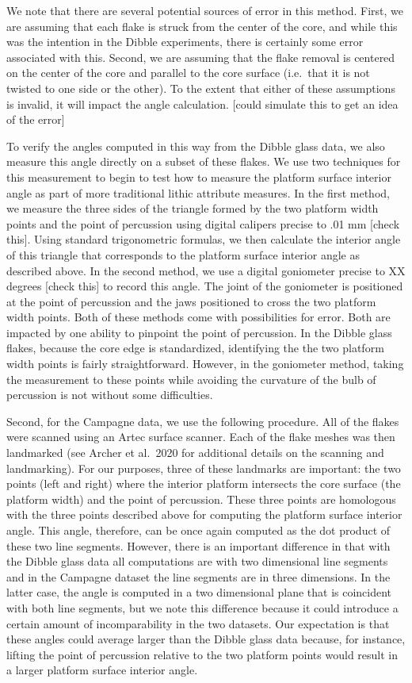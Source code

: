 \documentclass[10pt,letterpaper]{article}
\begin{document}
We note that there are several potential sources of error in this
method. First, we are assuming that each flake is struck from the center
of the core, and while this was the intention in the Dibble experiments,
there is certainly some error associated with this. Second, we are
assuming that the flake removal is centered on the center of the core
and parallel to the core surface (i.e.~that it is not twisted to one
side or the other). To the extent that either of these assumptions is
invalid, it will impact the angle calculation. {[}could simulate this to
get an idea of the error{]}

To verify the angles computed in this way from the Dibble glass data, we
also measure this angle directly on a subset of these flakes. We use two
techniques for this measurement to begin to test how to measure the
platform surface interior angle as part of more traditional lithic
attribute measures. In the first method, we measure the three sides of
the triangle formed by the two platform width points and the point of
percussion using digital calipers precise to .01 mm {[}check this{]}.
Using standard trigonometric formulas, we then calculate the interior
angle of this triangle that corresponds to the platform surface interior
angle as described above. In the second method, we use a digital
goniometer precise to XX degrees {[}check this{]} to record this angle.
The joint of the goniometer is positioned at the point of percussion and
the jaws positioned to cross the two platform width points. Both of
these methods come with possibilities for error. Both are impacted by
one ability to pinpoint the point of percussion. In the Dibble glass
flakes, because the core edge is standardized, identifying the the two
platform width points is fairly straightforward. However, in the
goniometer method, taking the measurement to these points while avoiding
the curvature of the bulb of percussion is not without some
difficulties.

Second, for the Campagne data, we use the following procedure. All of
the flakes were scanned using an Artec surface scanner. Each of the
flake meshes was then landmarked (see Archer et al.~2020 for additional
details on the scanning and landmarking). For our purposes, three of
these landmarks are important: the two points (left and right) where the
interior platform intersects the core surface (the platform width) and
the point of percussion. These three points are homologous with the
three points described above for computing the platform surface interior
angle. This angle, therefore, can be once again computed as the dot
product of these two line segments. However, there is an important
difference in that with the Dibble glass data all computations are with
two dimensional line segments and in the Campagne dataset the line
segments are in three dimensions. In the latter case, the angle is
computed in a two dimensional plane that is coincident with both line
segments, but we note this difference because it could introduce a
certain amount of incomparability in the two datasets. Our expectation
is that these angles could average larger than the Dibble glass data
because, for instance, lifting the point of percussion relative to the
two platform points would result in a larger platform surface interior
angle.
\end{document}
